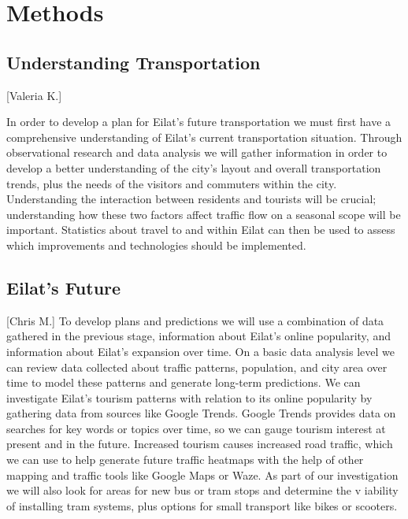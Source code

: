\documentclass[12pt]{article}                         %
\begin{document}

\newpage
\section{Methods}

\subsection{Understanding Transportation}[Valeria K.]

In order to develop a plan for Eilat's future transportation we must first have a comprehensive understanding of Eilat's current transportation situation. Through observational research and data analysis we will gather information in order to develop a better understanding of the city's layout and overall transportation trends, plus the needs of the visitors and commuters within the city. Understanding the interaction between residents and tourists will be crucial; understanding how these two factors affect traffic flow on a seasonal scope will be important. Statistics about travel to and within Eilat can then be used to assess which improvements and technologies should be implemented.

\subsection{Eilat's Future}[Chris M.]
To develop plans and predictions we will use a combination of data gathered in the previous stage, information about Eilat's online popularity, and information about Eilat's expansion over time. On a basic data analysis level we can review data collected about traffic patterns, population, and city area over time to model these patterns and generate long-term predictions. We can investigate Eilat's tourism patterns with relation to its online popularity by gathering data from sources like Google Trends. Google Trends provides data on searches for key words or topics over time, so we can gauge tourism interest at present and in the future. Increased tourism causes increased road traffic, which we can use to help generate future traffic heatmaps with the help of other mapping and traffic tools like Google Maps or Waze. As part of our investigation we will also look for areas for new bus or tram stops and determine the v	iability of installing tram systems, plus options for small transport like bikes or scooters.
\end{document}
